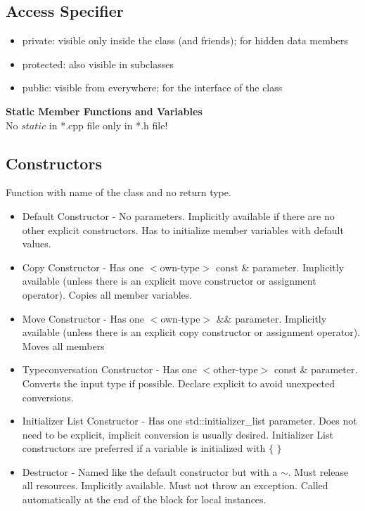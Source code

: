 \subsection{Access Specifier}
\begin{itemize}
  \itemsep -0.5em 
  \item private: visible only inside the class (and friends); for hidden data members
  \item protected: also visible in subclasses 
  \item public: visible from everywhere; for the interface of the class
\end{itemize}


\textbf{Static Member Functions and Variables}\\
No $static$ in *.cpp file only in *.h file!

\subsection{Constructors}
Function with name of the class and no return type. 
\begin{itemize}
    \item Default Constructor - No parameters. Implicitly available if there are no other explicit constructors. Has to initialize member variables with default values.
    \item Copy Constructor - Has one $<$own-type$>$ const \& parameter. Implicitly available (unless there is an explicit move constructor or assignment operator). Copies all member variables.
    \item Move Constructor - Has one $<$own-type$>$ \&\& parameter. Implicitly available (unless there is an explicit copy constructor or assignment operator). Moves all members
    \item Typeconversation Constructor - Has one $<$other-type$>$ const \& parameter. Converts the input type if possible. Declare explicit to avoid unexpected conversions.
    \item Initializer List Constructor - Has one std::initializer\_list parameter. Does not need to be explicit, implicit conversion is usually desired. Initializer List constructors are preferred if a variable is initialized with $\{$ $\}$
    \item Destructor - Named like the default constructor but with a $\sim$. Must release all resources. Implicitly available. Must not throw an exception. Called automatically at the end of the block for local instances.
\end{itemize}

